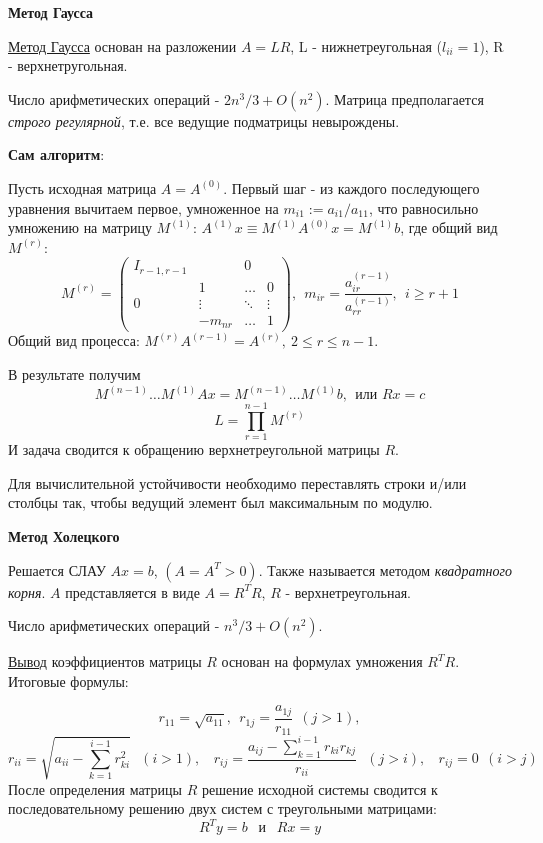 \documentclass[specialist, subf, href, colorlinks=true, 12pt, times, mtpro, final]{disser}
\theoremstyle{definition}
\begin{document}
    \begin{center} \textbf{Метод Гаусса} \end{center}
    \hyperlink {lects.52}{Метод Гаусса} основан на разложении $A = LR$, L - нижнетреугольная ($l_{ii} = 1$), R - верхнетругольная.
{
    Число арифметических операций - $2n^3/3 + O(n^2)$. Матрица предполагается \emph{строго регулярной}, т.е. все ведущие подматрицы невырождены.
    
    {\bf Сам алгоритм}:

    Пусть исходная матрица $A = A^{(0)}$. Первый шаг - из каждого последующего уравнения вычитаем первое, умноженное на $m_{i1} := a_{i1}/a_{11}$, что равносильно умножению на матрицу $M^{(1)}$: $A^{(1)}x \equiv M^{(1)} A^{(0)}x = M^{(1)}b$, где общий вид $M^{(r)}$:
    \begin{equation*}
    M^{(r)} = \left(
    \begin{array}{cccc}
        I_{r-1,r-1} & & 0 & \\
                   & 1& \ldots & 0\\
        0          & \vdots& \ddots & \vdots\\
                   & -m_{nr} & \ldots & 1
        \end{array}
        \right), \ \ 
        m_{ir} = \frac{a_{ir}^{(r-1)}}{a_{rr}^{(r-1)}}, \ \
        i \ge r + 1
    \end{equation*}
    Общий вид процесса: $M^{(r)}A^{(r-1)} = A^{(r)}, \ 2 \le r \le n-1$.

    В результате получим
    $$M^{(n-1)} \dots M^{(1)} Ax = M^{(n-1)} \dots M^{(1)} b, \ \ \text{или } Rx = c$$
    $$L = \prod \limits_{r=1}^{n-1} M^{(r)}$$
    И задача сводится к обращению верхнетреугольной матрицы $R$. 
        
    Для вычислительной устойчивости необходимо переставлять строки и/или столбцы так, чтобы ведущий элемент был максимальным по модулю.  

    \begin{center} \textbf{Метод Холецкого} \end{center}
    Решается СЛАУ $Ax = b$, $(A = A^T > 0)$. Также называется методом \emph{квадратного корня}. $A$ представляется в виде $A = R^TR$, $R$ - верхнетреугольная.
    
    Число арифметических операций - $n^3/3 + O(n^2)$.

    \hyperlink {lects.53}{Вывод} коэффициентов матрицы $R$ основан на формулах умножения $R^TR$. Итоговые формулы:

    $$
    r_{11} = \sqrt{a_{11}}, \ \ r_{1j} = \frac{a_{1j}}{r_{11}} \ \ (j > 1),
    $$
    $$
    r_{ii} = \sqrt{a_{ii} - \sum \limits_{k=1}^{i-1} r^2_{ki}} \ \ \ (i > 1),  \ \ \ \    r_{ij} = \frac{a_{ij} - \sum \limits_{k = 1}^{i-1} r_{ki} r_{kj}}{r_{ii}} \ \ \ (j > i), \ \ \ \ r_{ij} = 0 \ \ (i > j)
    $$
    После определения матрицы $R$ решение исходной системы сводится к последовательному решению двух систем с треугольными матрицами:
    $$
    R^Ty = b \ \ \text{ и } \ \  Rx = y 
    $$
}
\end{document}
